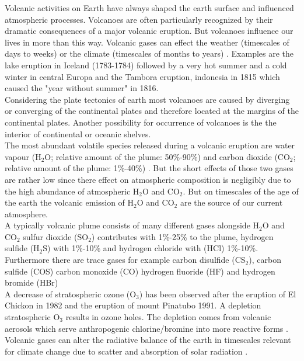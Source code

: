 
Volcanic activities on Earth have  always shaped the earth surface and influenced atmospheric processes. Volcanoes are often particularly recognized by their dramatic consequences of a major volcanic eruption. But volcanoes influence our lives in more than this way. Volcanic gases can effect the weather (timescales of days to weeks) or the climate (timescales of months to years) \cite{schmidt2015volcanismarticle}.
Examples are the lake eruption in Iceland (1783-1784) followed by a very hot summer and a cold winter in central Europa \cite{thordarson2003atmospheric} and the Tambora eruption, indonesia in 1815 which caused the "year without summer" in 1816.\\
%
\newline
%
Considering the plate tectonics of earth  most volcanoes are caused by diverging or converging of the continental plates and therefore located at the margins of the continental plates.
Another possibility for occurrence of volcanoes is the the interior of continental or oceanic shelves. \cite{schmincke2000vulkanismus}\\
The most abundant volatile species released during a volcanic eruption are water vapour (H$_2$O; relative amount of the plume: 50\%-90\%) and carbon dioxide (CO$_2$; relative amount of the plume: 1\%-40\%) \cite{platt2015quantification}. But the short effects of those two gases are rather low since there effect on atmospheric composition is negligibly due to the high abundance of atmospheric H$_2$O and CO$_2$. But on timescales of the age of the earth the volcanic emission of H$_2$O and CO$_2$ are the source of our current atmosphere. \cite{schmidt2015volcanism}\\ 
A typically volcanic plume consists of many different gases alongside H$_2$O and CO$_2$  sulfur dioxide (SO$_2$) contributes with 1\%-25\% to the plume, hydrogen sulfide (H$_2$S) with 1\%-10\% and hydrogen chloride with (HCl) 1\%-10\%. Furthermore there are trace gases for example carbon disulfide (CS$_2$), carbon sulfide (COS) carbon monoxide (CO) hydrogen fluoride (HF) and hydrogen bromide (HBr) \cite{platt2015quantification}\\
%
A decrease of stratospheric ozone (O$_3$) has been observed after the eruption of  El Chickon in 1982 and the eruption of mount Pinatubo 1991. A depletion stratospheric O$_3$ results in ozone holes. The depletion comes from volcanic aerosols which serve anthropogenic chlorine/bromine into more reactive forms \cite{solomon1998ozone}. 
%
Volcanic gases can alter the radiative balance of the earth in timescales relevant for climate change due to scatter and absorption of solar radiation \cite{schmidt2015volcanism}.\\
